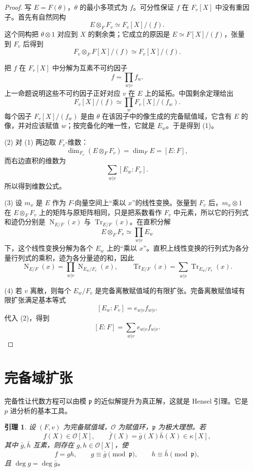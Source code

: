 \documentclass[11pt,a4paper,openany]{ctexbook}
\numberwithin{equation}{chapter}
\newcommand{\Tr}{\operatorname{Tr}}
\newcommand{\Nm}{\operatorname{N}}
\theoremstyle{plain}
\newtheorem{lemma}[theorem]{引理}
\theoremstyle{definition}
\theoremstyle{remark}
\begin{document}
\begin{proof}
写 $E=F(\theta)$，$\theta$ 的最小多项式为 $f$。可分性保证 $f$ 在
$F_v[X]$ 中没有重因子。首先有自然同构
\[
E\otimes_FF_v\simeq F_v[X]/(f).
\]
这个同构把 $\theta\otimes1$ 对应到 $X$ 的剩余类；它成立的原因是
$E\simeq F[X]/(f)$，张量到 $F_v$ 后得到
\[
F_v\otimes_FF[X]/(f)\simeq F_v[X]/(f).
\]

把 $f$ 在 $F_v[X]$ 中分解为互素不可约因子
\[
f=\prod_{w|v} f_w.
\]
上一命题说明这些不可约因子正好对应 $v$ 在 $E$ 上的延拓。中国剩余定理给出
\[
F_v[X]/(f)\simeq\prod_w F_v[X]/(f_w).
\]
每个因子 \(F_v[X]/(f_w)\) 是由 $\theta$ 在该因子中的像生成的完备赋值域，它含有 $E$ 的像，并对应该赋值 $w$；按完备化的唯一性，它就是 $E_w$。于是得到 (1)。

(2) 对 (1) 两边取 $F_v$-维数：
\[
\dim_{F_v}(E\otimes_FF_v)=\dim_F E=[E:F],
\]
而右边直积的维数为
\[
\sum_{w|v}[E_w:F_v].
\]
所以得到维数公式。

(3) 设 $m_x$ 是 $E$ 作为 $F$-向量空间上“乘以 $x$”的线性变换。张量到
$F_v$ 后，$m_x\otimes1$ 在
$E\otimes_FF_v$ 上的矩阵与原矩阵相同，只是把系数看作 $F_v$ 中元素，所以它的行列式和迹仍分别是
\(\Nm_{E/F}(x)\) 与 \(\Tr_{E/F}(x)\)。在直积分解
\[
E\otimes_FF_v\simeq\prod_{w|v}E_w
\]
下，这个线性变换分解为各个 $E_w$ 上的“乘以 $x$”。直积上线性变换的行列式为各分量行列式的乘积，迹为各分量迹的和，因此
\[
\Nm_{E/F}(x)=\prod_{w|v}\Nm_{E_w/F_v}(x),
\qquad
\Tr_{E/F}(x)=\sum_{w|v}\Tr_{E_w/F_v}(x).
\]

(4) 若 $v$ 离散，则每个 $E_w/F_v$ 是完备离散赋值域的有限扩张。完备离散赋值域有限扩张满足基本等式
\[
[E_w:F_v]=e_{w|v}f_{w|v}.
\]
代入 (2)，得到
\[
[E:F]=\sum_{w|v}e_{w|v}f_{w|v}.
\]
\end{proof}

\section{完备域扩张}

完备性让代数方程可以由模 $\mathfrak p$ 的近似解提升为真正解，这就是 Hensel 引理。它是 $p$ 进分析的基本工具。

\begin{lemma}
设 $(F,v)$ 为完备赋值域，$\mathcal O$ 为赋值环，$\mathfrak p$ 为极大理想。若
\[
f(X)\in\mathcal O[X],\qquad
\bar f(X)=\bar g(X)\bar h(X)\in\kappa[X],
\]
其中 $\bar g,\bar h$ 互素，则存在 $g,h\in\mathcal O[X]$，使
\[
f=gh,\qquad g\equiv\bar g\pmod{\mathfrak p},\qquad
h\equiv\bar h\pmod{\mathfrak p},
\]
且 $\deg g=\deg\bar g$。
\end{lemma}
\end{document}
